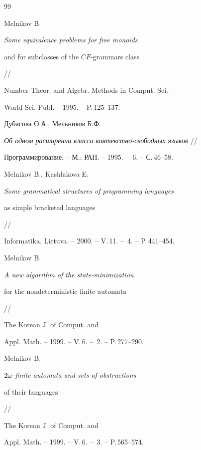  \begin{thebibliography}{99}







 Melnikov B.


{\em Some equivalence problems for free monoids


 and for subclasses of the $CF$-grammars class} // 


 Number Theor. and Algebr. Methods in Comput. Sci. --


 World Sci. Publ. -- 1995. -- P.\,125--137.







 Дубасова О.А., Мельников Б.Ф.


{\em Об одном расширении класса контекстно-свободных языков} // 


 Программирование. -- М.: РАН. -- 1995. -- \No\,6. -- С.\,46--58.







 Melnikov B., Kashlakova E.


{\em Some grammatical structures of programming languages


 as simple bracketed languages} // 


 Informatika. Lietuva. -- 2000. -- V.\,11. -- \No\,4. -- P.\,441--454.







 Melnikov B.


{\em A new algorithm of the state-minimization


 for the nondeterministic finite automata} // 


 The Korean J. of Comput. and


 Appl. Math. -- 1999. -- V.\,6. -- \No\,2. -- P.\,277--290.







 Melnikov B.


{\em $2\omega$-finite automata and sets of obstructions


 of their languages} // 


 The Korean J. of Comput. and


 Appl. Math. -- 1999. -- V.\,6. -- \No\,3. -- P.\,565--574.






\end{thebibliography}
